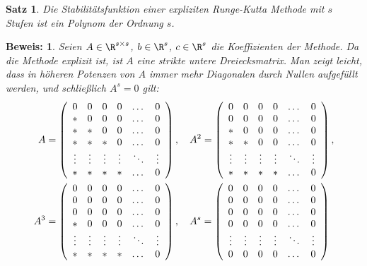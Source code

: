 \documentclass[
]{mycourse}
\theoremstyle{mythm}
\newtheorem{theorem}{Satz}[chapter]
\theoremstyle{break}
\newtheorem*{beweis}{Beweis:}
\begin{document}
\begin{theorem}\label{thm:expl_RK_polynomial}
Die Stabilitätsfunktion einer expliziten Runge-Kutta Methode mit $s$ Stufen ist ein Polynom der Ordnung $s$.
\end{theorem}
\begin{beweis}
Seien $A\in \R^{s\times s}$, $b\in \R^s$, $c\in \R^s$ die Koeffizienten der Methode. 
Da die Methode explizit ist, ist $A$ eine strikte untere Dreiecksmatrix. Man zeigt leicht, 
dass in höheren Potenzen von $A$ immer mehr Diagonalen durch Nullen aufgefüllt werden, und
schließlich $A^s=0$ gilt:
\begin{align*}
A&=\left( \begin{array}{c c c c c c}
0 & 0 & 0 & 0 & \dots & 0\\
* & 0 & 0 & 0 & \dots & 0\\
* & * & 0 & 0 & \dots & 0\\
* & * & * & 0 & \dots & 0\\
\vdots & \vdots & \vdots & \vdots & \ddots & \vdots\\
* & * & * & * &  \dots & 0\\
\end{array}\right), \quad
A^2=\left( \begin{array}{c c c c c c}
0 & 0 & 0 & 0 & \dots & 0\\
0 & 0 & 0 & 0 & \dots & 0\\
* & 0 & 0 & 0 & \dots & 0\\
* & * & 0 & 0 & \dots & 0\\
\vdots & \vdots & \vdots & \vdots & \ddots & \vdots\\
* & * & * & * &  \dots & 0\\
\end{array}\right),\\
A^3&=\left( \begin{array}{c c c c c c}
0 & 0 & 0 & 0 & \dots & 0\\
0 & 0 & 0 & 0 & \dots & 0\\
0 & 0 & 0 & 0 & \dots & 0\\
* & 0 & 0 & 0 & \dots & 0\\
\vdots & \vdots & \vdots & \vdots & \ddots & \vdots\\
* & * & * & * &  \dots & 0\\
\end{array}\right), \quad
A^s=\left( \begin{array}{c c c c c c}
0 & 0 & 0 & 0 & \dots & 0\\
0 & 0 & 0 & 0 & \dots & 0\\
0 & 0 & 0 & 0 & \dots & 0\\
0 & 0 & 0 & 0 & \dots & 0\\
\vdots & \vdots & \vdots & \vdots & \ddots & \vdots\\
0 & 0 & 0 & 0 &  \dots & 0\\
\end{array}\right)
\end{align*}


\end{beweis}
\end{document}
